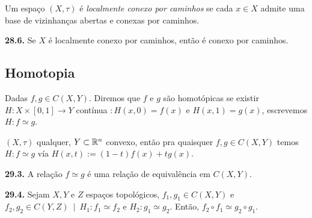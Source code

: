 \vspace{-0.4cm}
\begin{definition}
    Um espaço \((X, \tau)\) é \emph{localmente conexo por caminhos} se cada \( x \in X\) admite uma base de vizinhanças abertas e  conexas por caminhos. 
\end{definition}

\begin{proposition}
    \textbf{28.6.} Se \(X\) é localmente conexo por caminhos, então é conexo por caminhos. 
\end{proposition}


\subsection*{Homotopia}

\begin{definition}
    Dadas \(f,g \in C(X,Y )\). Diremos que \(f\) e \(g\) são homotópicas se existir \(H: X \times [0,1] \to Y\) contínua \(: H(x,0) = f(x)\) e \(H(x,1) = g(x)\), escrevemos \(H: f \simeq g\).  
\end{definition}

\begin{example}
    \((X,\tau)\) qualquer, \(Y \subset \mathbb{R}^n\) convexo, então pra quaisquer \(f,g \in C(X,Y)\) temos \(H: f\simeq g\) vía \(H(x,t):= (1-t)f(x) + tg(x)\). 
\end{example}

\begin{proposition}
    \textbf{29.3.} A relação \(f\simeq g\) é uma relação de equivalência em \(C(X,Y)\). 
\end{proposition}

\begin{proposition}
    \textbf{29.4.} Sejam \(X,Y \) e \(Z\) espaços topológicos, \(f_1, g_1 \in C(X,Y)\) e \(f_2, g_2 \in C(Y,Z) \ \mid \  H_1:  f_1\simeq f_2\) e \(H_2: g_1 \simeq g_2\). Então, \(f_2 \circ f_1 \simeq g_2 \circ g_1\).  
\end{proposition}

